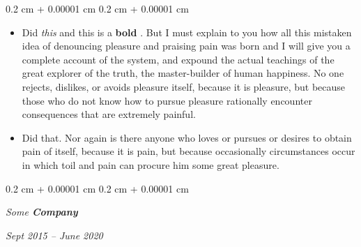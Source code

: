 \documentclass[10pt, letterpaper]{article}
\newenvironment{highlights}{
    \begin{itemize}[
        topsep=0.10 cm,
        parsep=0.10 cm,
        partopsep=0pt,
        itemsep=0pt,
        leftmargin=0.4 cm + 10pt
    ]
}{
    \end{itemize}
} %
\newenvironment{onecolentry}{
    \begin{adjustwidth}{
        0.2 cm + 0.00001 cm
    }{
        0.2 cm + 0.00001 cm
    }
}{
    \end{adjustwidth}
} %
\newenvironment{twocolentry}[2][]{
    \onecolentry
    \def\secondColumn{#2}
    \setcolumnwidth{\fill, 4.5 cm}
    \begin{paracol}{2}
}{
    \switchcolumn \raggedleft \secondColumn
    \end{paracol}
    \endonecolentry
} %
\let\hrefWithoutArrow\href
\renewcommand{\href}[2]{\hrefWithoutArrow{#1}{\ifthenelse{\equal{#2}{}}{ }{#2 }\raisebox{.15ex}{\footnotesize \faExternalLink*}}}
\begin{document}
        \vspace{0.10 cm}
        \begin{onecolentry}
            \begin{highlights}
                \item Did \textit{this} and this is a \textbf{bold} \href{https://example.com}{link}. But I must explain to you how all this mistaken idea of denouncing pleasure and praising pain was born and I will give you a complete account of the system, and expound the actual teachings of the great explorer of the truth, the master-builder of human happiness. No one rejects, dislikes, or avoids pleasure itself, because it is pleasure, but because those who do not know how to pursue pleasure rationally encounter consequences that are extremely painful.
                \item Did that. Nor again is there anyone who loves or pursues or desires to obtain pain of itself, because it is pain, but because occasionally circumstances occur in which toil and pain can procure him some great pleasure.
            \end{highlights}
        \end{onecolentry}


        \vspace{0.2 cm}

            \begin{twocolentry}{


        \textit{Sept 2015 – June 2020}    }
                \textbf{}

                \textit{Some \textbf{Company}}
            \end{twocolentry}
\end{document}
